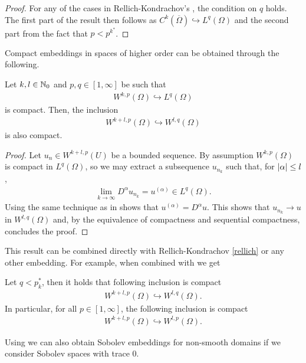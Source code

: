 \documentclass[
    a4paper,
    DIV=14,
    abstract=true,
    numbers=noenddot
]{scrartcl}
\begin{document}
\begin{proof}
	For any of the cases in Rellich-Kondrachov's , the condition on $q$ holds. The first part of the result then follows as  $C^k(\overline{\Omega}) \hookrightarrow L^q(\Omega)$ and the second part from the fact that  $p< p^{k^*}$.
\end{proof}
Compact embeddings in spaces of higher order can be obtained through the following.
\begin{proposition}
	Let  $k,l \in \mathbb{N}_0$ and $p,q \in [1,\infty]$ be such that
	\begin{align*}
		W^{k,p}(\Omega)\hookrightarrow L^q(\Omega)
	\end{align*}
	is compact. Then, the inclusion
	\begin{align*}
		W^{k+l,p}(\Omega)\hookrightarrow W^{l,q}(\Omega)
	\end{align*}
	is also compact.
\end{proposition}
\begin{proof}
	Let $u_n \in W^{k+l,p}(U)$ be a bounded sequence. By assumption $ W^{k,p}(\Omega)$ is compact in  $L^q(\Omega)$, so we may extract a subsequence $u_{n_k}$ such that, for  ${\left| \alpha \right|} \leq l $,
	\begin{align*}
		\lim_{k \to \infty}D^\alpha u_{n_k} = u^{(\alpha)} \in L^q(\Omega) .
	\end{align*}
	Using the same technique as in  shows that $u^{(\alpha)}= D^{\alpha}u$. This shows that $u_{n_k} \to u$ in $W^{l,q}(\Omega)$ and, by the equivalence of compactness and sequential compactness, concludes the proof.
\end{proof}
This result can be combined directly with Rellich-Kondrachov \ref{rellich} or any other embedding. For example, when combined with  we get
\begin{corollary}
	Let $q< p_k^*$, then it holds that following inclusion is compact
	\begin{align*}
		W^{k+l,p}(\Omega) \hookrightarrow W^{l,q}(\Omega).
	\end{align*}
	In particular, for all $p \in [1, \infty]$, the following inclusion is compact
	\begin{align*}
		W^{k+l,p}(\Omega) \hookrightarrow W^{l,p}(\Omega).
	\end{align*}
\end{corollary}

Using  we can also obtain Sobolev embeddings for non-smooth domains if we consider Sobolev spaces with trace $0$.
\end{document}
